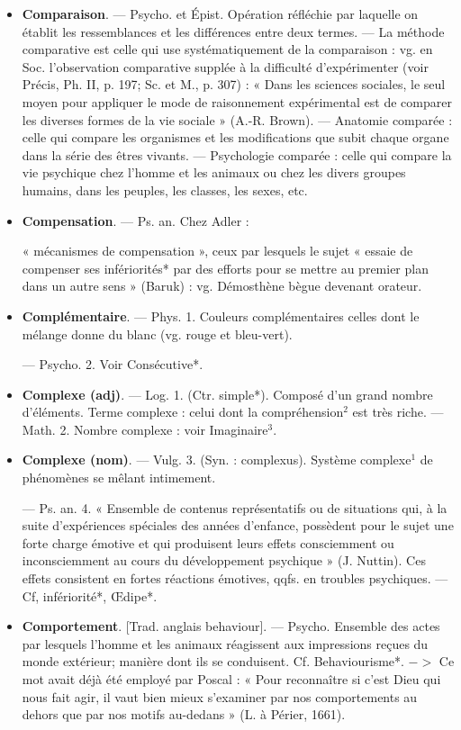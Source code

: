 \begin{itemize}[leftmargin=1cm, label=, itemsep=11pt]
\item {\bf Comparaison}. — Psycho. et Épist.
Opération réfléchie par laquelle on
établit les ressemblances et les différences entre deux termes. — La méthode comparative est celle qui use
systématiquement de la comparaison : vg. en Soc. l'observation comparative supplée à la difficulté
d’expérimenter (voir Précis, Ph. II,
p. 197; Sc. et M., p. 307) : « Dans les
sciences sociales, le seul moyen pour
appliquer le mode de raisonnement
expérimental est de comparer les
diverses formes de la vie sociale »
(A.-R. Brown). — Anatomie comparée : celle qui compare les organismes et les modifications que
subit chaque organe dans la série
des êtres vivants. — Psychologie
comparée : celle qui compare la vie
psychique chez l’homme et les animaux ou chez les divers groupes
humains, dans les peuples, les
classes, les sexes, etc.

\item {\bf Compensation}. — Ps. an. Chez Adler :

« mécanismes de compensation »,
ceux par lesquels le sujet « essaie de
compenser ses infériorités* par des
efforts pour se mettre au premier
plan dans un autre sens » (Baruk) :
vg. Démosthène bègue devenant
orateur.

\item {\bf Complémentaire}. — Phys. 1. Couleurs
complémentaires celles dont le
mélange donne du blanc (vg. rouge
et bleu-vert).

— Psycho. 2. Voir Consécutive*.

\item {\bf Complexe (adj)}. — Log. 1. (Ctr.
simple*). Composé d’un grand nombre d'éléments. Terme complexe :
celui dont la compréhension$^2$ est
très riche. — Math. 2. Nombre complexe : voir Imaginaire$^3$.

\item {\bf Complexe (nom)}. — Vulg. 3. (Syn. :
complexus). Système complexe$^1$ de
phénomènes se mêlant intimement.

— Ps. an. 4. « Ensemble de contenus représentatifs ou de situations qui, à la suite d'expériences
spéciales des années d'enfance, possèdent pour le sujet une forte charge
émotive et qui produisent leurs
effets consciemment ou inconsciemment au cours du développement
psychique » (J. Nuttin). Ces effets
consistent en fortes réactions émotives, qqfs. en troubles psychiques.
— Cf, infériorité*, Œdipe*.

\item {\bf Comportement}. [Trad. anglais behaviour]. — Psycho. Ensemble des
actes par lesquels l’homme et les
animaux réagissent aux impressions
reçues du monde extérieur; manière
dont ils se conduisent. Cf. Behaviourisme*. $->$ Ce mot avait déjà
été employé par Poscal : « Pour
reconnaître si c'est Dieu qui nous
fait agir, il vaut bien mieux s’examiner par nos comportements au
dehors que par nos motifs au-dedans »
(L. à Périer, 1661).


\end{itemize}
